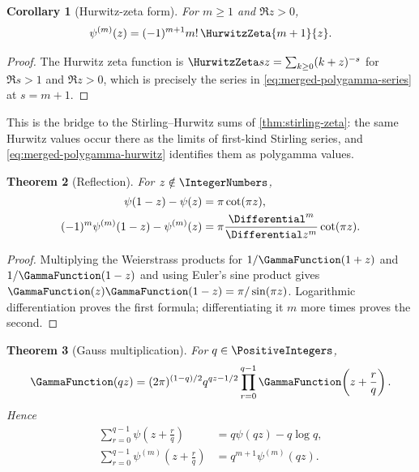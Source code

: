 \documentclass[11pt,a4paper,oneside,openany]{book}
\newtheorem{theorem}{Theorem}[chapter]
\newtheorem{corollary}[theorem]{Corollary}
\theoremstyle{definition}
\theoremstyle{remark}
\begin{document}
\begin{corollary}[Hurwitz-zeta form]\label{cor:merged-polygamma-hurwitz}
For $m\geq1$ and $\Re z>0$,
\begin{equation}
 \psi^{(m)}(z)=(-1)^{m+1}m!\,\HurwitzZeta{m+1}{z}.                \label{eq:merged-polygamma-hurwitz}
\end{equation}
\end{corollary}

\begin{proof}
The Hurwitz zeta function is $\HurwitzZeta sz=\sum_{k\geq0}(k+z)^{-s}$ for
$\Re s>1$ and $\Re z>0$, which is precisely the series in
\eqref{eq:merged-polygamma-series} at $s=m+1$.
\end{proof}

This is the bridge to the Stirling--Hurwitz sums of
\cref{thm:stirling-zeta}: the same Hurwitz values occur there as the limits of
first-kind Stirling series, and \eqref{eq:merged-polygamma-hurwitz} identifies
them as polygamma values.

\begin{theorem}[Reflection]
\label{thm:merged-polygamma-reflection}
For $z\notin\IntegerNumbers$,
\begin{align}
 \psi(1-z)-\psi(z)&=\pi\cot(\pi z),                                 \label{eq:merged-digamma-reflection}\\
 (-1)^m\psi^{(m)}(1-z)-\psi^{(m)}(z)
 &=\pi\frac{\Differential^m}{\Differential z^m}\cot(\pi z).                            \label{eq:merged-polygamma-reflection}
\end{align}
\end{theorem}

\begin{proof}
Multiplying the Weierstrass products for $1/\GammaFunction(1+z)$ and
$1/\GammaFunction(1-z)$ and using Euler's sine product gives
$\GammaFunction(z)\GammaFunction(1-z)=\pi/\sin(\pi z)$.  Logarithmic differentiation proves
the first formula; differentiating it $m$ more times proves the second.
\end{proof}

\begin{theorem}[Gauss multiplication]
\label{thm:merged-gauss-multiplication}
For $q\in\PositiveIntegers$,
\begin{equation}
 \GammaFunction(qz)=(2\pi)^{(1-q)/2}q^{qz-1/2}
 \prod_{r=0}^{q-1}\GammaFunction\!\left(z+\frac rq\right).                 \label{eq:merged-gauss-multiplication}
\end{equation}
Hence
\begin{align}
 \sum_{r=0}^{q-1}\psi\!\left(z+\frac rq\right)
 &=q\psi(qz)-q\log q,                                              \label{eq:merged-digamma-mult}\\
 \sum_{r=0}^{q-1}\psi^{(m)}\!\left(z+\frac rq\right)
 &=q^{m+1}\psi^{(m)}(qz).                                          \label{eq:merged-polygamma-mult}
\end{align}
\end{theorem}
\end{document}
